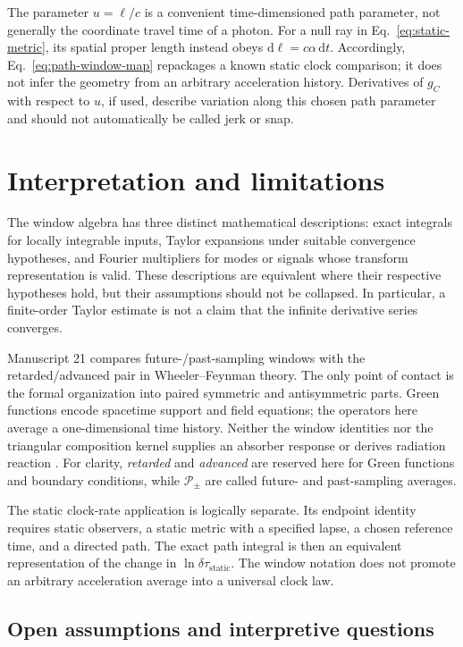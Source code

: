 \documentclass[12pt]{article}
\begin{document}
The parameter $u=\ell/c$ is a convenient time-dimensioned path parameter, not generally the coordinate travel time of a photon. For a null ray in Eq.~\eqref{eq:static-metric}, its spatial proper length instead obeys $\mathrm{d}\ell=c\alpha\,\mathrm{d}t$. Accordingly, Eq.~\eqref{eq:path-window-map} repackages a known static clock comparison; it does not infer the geometry from an arbitrary acceleration history. Derivatives of $g_C$ with respect to $u$, if used, describe variation along this chosen path parameter and should not automatically be called jerk or snap.

\section{Interpretation and limitations}

The window algebra has three distinct mathematical descriptions: exact integrals for locally integrable inputs, Taylor expansions under suitable convergence hypotheses, and Fourier multipliers for modes or signals whose transform representation is valid. These descriptions are equivalent where their respective hypotheses hold, but their assumptions should not be collapsed. In particular, a finite-order Taylor estimate is not a claim that the infinite derivative series converges.

Manuscript 21 compares future-/past-sampling windows with the retarded/advanced pair in Wheeler--Feynman theory. The only point of contact is the formal organization into paired symmetric and antisymmetric parts. Green functions encode spacetime support and field equations; the operators here average a one-dimensional time history. Neither the window identities nor the triangular composition kernel supplies an absorber response or derives radiation reaction \cite{LMP21}. For clarity, \emph{retarded} and \emph{advanced} are reserved here for Green functions and boundary conditions, while $\mathcal{P}_{\pm}$ are called future- and past-sampling averages.

The static clock-rate application is logically separate. Its endpoint identity requires static observers, a static metric with a specified lapse, a chosen reference time, and a directed path. The exact path integral is then an equivalent representation of the change in $\ln\delta\tau_{\mathrm{static}}$. The window notation does not promote an arbitrary acceleration average into a universal clock law.

\subsection{Open assumptions and interpretive questions}
\end{document}
